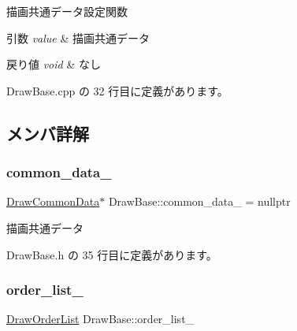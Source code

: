 描画共通データ設定関数 


\begin{DoxyParams}{引数}
{\em value} & 描画共通データ \\
\hline
\end{DoxyParams}

\begin{DoxyRetVals}{戻り値}
{\em void} & なし \\
\hline
\end{DoxyRetVals}


 Draw\+Base.\+cpp の 32 行目に定義があります。



\subsection{メンバ詳解}
\mbox{\label{class_draw_base_a44e99e97b203c9cffa794b65df77539a}} 
\subsubsection{\texorpdfstring{common\+\_\+data\+\_\+}{common\_data\_}}
{\footnotesize\ttfamily \mbox{\hyperlink{class_draw_common_data}{Draw\+Common\+Data}}$\ast$ Draw\+Base\+::common\+\_\+data\+\_\+ = nullptr\hspace{0.3cm}{\ttfamily [private]}}



描画共通データ 



 Draw\+Base.\+h の 35 行目に定義があります。

\mbox{\label{class_draw_base_a68325df7021177f7ca82a18511e1328f}} 
\subsubsection{\texorpdfstring{order\+\_\+list\+\_\+}{order\_list\_}}
{\footnotesize\ttfamily \mbox{\hyperlink{class_draw_order_list}{Draw\+Order\+List}} Draw\+Base\+::order\+\_\+list\+\_\+\hspace{0.3cm}{\ttfamily [private]}}



